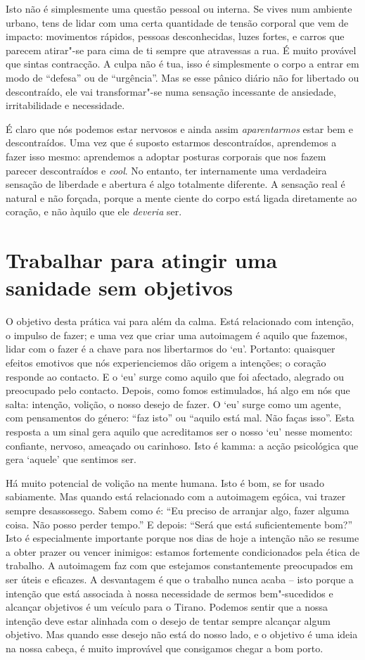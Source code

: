 Isto não é simplesmente uma questão pessoal ou interna. Se vives num
ambiente urbano, tens de lidar com uma certa quantidade de tensão
corporal que vem de impacto: movimentos rápidos, pessoas desconhecidas,
luzes fortes, e carros que parecem atirar"-se para cima de ti sempre que
atravessas a rua. É muito provável que sintas contracção. A culpa não é
tua, isso é simplesmente o corpo a entrar em modo de “defesa” ou de
“urgência”. Mas se esse pânico diário não for libertado ou descontraído,
ele vai transformar"-se numa sensação incessante de ansiedade,
irritabilidade e necessidade.

É claro que nós podemos estar nervosos e ainda assim \emph{aparentarmos}
estar bem e descontraídos. Uma vez que é suposto estarmos descontraídos,
aprendemos a fazer isso mesmo: aprendemos a adoptar posturas corporais
que nos fazem parecer descontraídos e \emph{cool}. No entanto, ter
internamente uma verdadeira sensação de liberdade e abertura é algo
totalmente diferente. A sensação real é natural e não forçada, porque a
mente ciente do corpo está ligada diretamente ao coração, e não àquilo
que ele \emph{deveria} ser.

\section{Trabalhar para atingir uma sanidade sem objetivos}

O objetivo desta prática vai para além da calma. Está relacionado com
intenção, o impulso de fazer; e uma vez que criar uma autoimagem é
aquilo que fazemos, lidar com o fazer é a chave para nos libertarmos do
`eu'. Portanto: quaisquer efeitos emotivos que nós experienciemos dão
origem a intenções; o coração responde ao contacto. E o `eu' surge como
aquilo que foi afectado, alegrado ou preocupado pelo contacto. Depois,
como fomos estimulados, há algo em nós que salta: intenção, volição, o
nosso desejo de fazer. O `eu' surge como um agente, com pensamentos do
género: “faz isto” ou “aquilo está mal. Não faças isso”. Esta resposta a
um sinal gera aquilo que acreditamos ser o nosso `eu' nesse momento:
confiante, nervoso, ameaçado ou carinhoso. Isto é kamma: a acção
psicológica que gera `aquele' que sentimos ser.

Há muito potencial de volição na mente humana. Isto é bom, se for usado
sabiamente. Mas quando está relacionado com a autoimagem egóica, vai
trazer sempre desassossego. Sabem como é: “Eu preciso de arranjar algo,
fazer alguma coisa. Não posso perder tempo.” E depois: “Será que está
suficientemente bom?” Isto é especialmente importante porque nos dias de
hoje a intenção não se resume a obter prazer ou vencer inimigos: estamos
fortemente condicionados pela ética de trabalho. A autoimagem faz com
que estejamos constantemente preocupados em ser úteis e eficazes. A
desvantagem é que o trabalho nunca acaba -- isto porque a intenção que
está associada à nossa necessidade de sermos bem"-sucedidos e alcançar
objetivos é um veículo para o Tirano. Podemos sentir que a nossa
intenção deve estar alinhada com o desejo de tentar sempre alcançar
algum objetivo. Mas quando esse desejo não está do nosso lado, e o
objetivo é uma ideia na nossa cabeça, é muito improvável que consigamos
chegar a bom porto.

